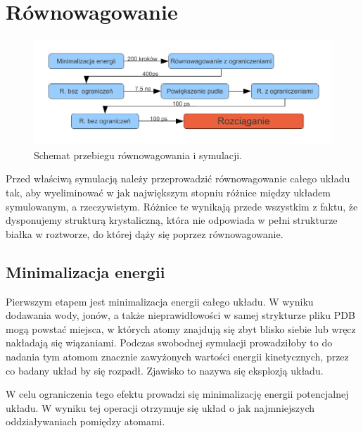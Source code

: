 \section{Równowagowanie}

\begin{figure}[h!]
\begin{centering}
\includegraphics[width=150mm]{./rys/schemat.pdf}
\caption{Schemat przebiegu równowagowania i symulacji.}
\end{centering}
\end{figure}

Przed właściwą symulacją należy przeprowadzić równowagowanie całego układu tak, aby wyeliminować w jak największym stopniu różnice między układem symulowanym, a rzeczywistym. Różnice te wynikają przede wszystkim z faktu, że dysponujemy strukturą krystaliczną, która nie odpowiada w pełni strukturze białka w roztworze, do której dąży się poprzez równowagowanie.


\subsection{Minimalizacja energii}

Pierwszym etapem jest minimalizacja energii całego układu. W wyniku dodawania wody, jonów, a także nieprawidłowości w samej strykturze pliku PDB mogą powstać miejsca, w których atomy znajdują się zbyt blisko siebie lub wręcz nakładają się wiązaniami. Podczas swobodnej symulacji prowadziłoby to do nadania tym atomom znacznie zawyżonych wartości energii kinetycznych, przez co badany układ by się rozpadł. Zjawisko to nazywa się eksplozją układu.

W celu ograniczenia tego efektu prowadzi się minimalizację energii potencjalnej układu. W wyniku tej operacji otrzymuje się układ o jak najmniejszych oddziaływaniach pomiędzy atomami. 


